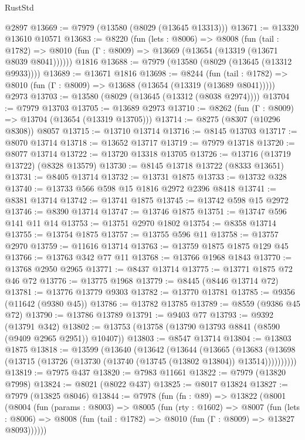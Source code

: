 \begin{lexlean}{RustStd}
\begin{coremodule}
    @2897
@13669 := @7979 (@13580 (@8029 (@13645 @13313)))
@13671 := @13320 @13610 @10571
@13683 := @8220
    (fun (lets : @8006) =>
    @8008
      (fun (tail : @1782) =>
      @8010 (fun (Γ : @8009) => @13669 (@13654 (@13319 (@13671 @8039 @8041))))))
    @1816
@13688 := @7979 (@13580 (@8029 (@13645 (@13312 @9933))))
@13689 := @13671 @1816
@13698 := @8244
    (fun (tail : @1782) => @8010 (fun (Γ : @8009) => @13688 (@13654 (@13319 (@13689 @8041)))))
    @2973
@13703 := @13580 (@8029 (@13645 (@13312 (@8038 @2974))))
@13704 := @7979 @13703
@13705 := @13689 @2973
@13710 := @8262 (fun (Γ : @8009) => @13704 (@13654 (@13319 @13705)))
@13714 := @8275 (@8307 (@10296 @8308)) @8057
@13715 := @13710 @13714
@13716 := @8145 @13703
@13717 := @8070 @13714
@13718 := @13652 @13717
@13719 := @7979 @13718
@13720 := @8077 @13714
@13722 := @13720 @13318 @13705
@13726 := @13716 (@13719 @13722) (@8328 @13579)
@13730 := @8145 @13718 @13722 (@8333 @13651)
@13731 := @8405 @13714
@13732 := @13731 @1875
@13733 := @13732 @328
@13740 := @13733 @566 @598 @15 @1816 @2972 @2396 @8418
@13741 := @8381 @13714
@13742 := @13741 @1875
@13745 := @13742 @598 @15 @2972
@13746 := @8390 @13714
@13747 := @13746 @1875
@13751 := @13747 @596 @141 @11 @14
@13753 := @13751 @2970 @1802
@13754 := @8358 @13714
@13755 := @13754 @1875
@13757 := @13755 @596 @11
@13758 := @13757 @2970
@13759 := @11616 @13714
@13763 := @13759 @1875 @1875 @129 @45
@13766 := @13763 @342 @77 @11
@13768 := @13766 @1968 @1843
@13770 := @13768 @2950 @2965
@13771 := @8437 @13714
@13775 := @13771 @1875 @72 @46 @72
@13776 := @13775 @1968
@13779 := @8445 (@8446 @13714 @72)
@13781 := @13776 @13779 @9303
@13782 := @13770 @13781
@13785 := @9356 (@11642 (@9380 @45))
@13786 := @13782 @13785
@13789 := @8559 (@9386 @45 @72)
@13790 := @13786 @13789
@13791 := @9403 @77
@13793 := @9392 (@13791 @342)
@13802 := @13753 (@13758 (@13790 @13793 @8841 (@8590 (@9409 @2965 @2951)) @10407))
@13803 := @8547 @13714
@13804 := @13803 @1875
@13818 := @13599
    (@13640
      (@13642
        (@13644
          (@13665
            (@13683
              (@13698 (@13715 (@13726 (@13730 (@13740 (@13745 (@13802 @13804)) @13514))))))))))
@13819 := @7975 @437
@13820 := @7983 @11661
@13822 := @7979 (@13820 @7998)
@13824 := @8021 (@8022 @437)
@13825 := @8017 @13824
@13827 := @7979 (@13825 @8046)
@13844 := @7978
    (fun (fn : @89) =>
    @13822
      (@8001
        (@8004
          (fun (params : @8003) =>
          @8005
            (fun (rty : @1602) =>
            @8007
              (fun (lets : @8006) =>
              @8008 (fun (tail : @1782) => @8010 (fun (Γ : @8009) => @13827 @8093))))))

\end{coremodule}
\end{lexlean}
